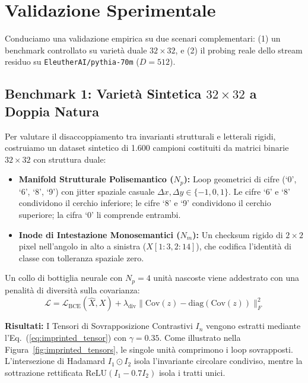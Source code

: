 \documentclass[11pt,a4paper]{article}
\theoremstyle{definition}
\begin{document}
\section{Validazione Sperimentale}

Conduciamo una validazione empirica su due scenari complementari: (1) un benchmark controllato su varietà duale $32 \times 32$, e (2) il probing reale dello stream residuo su \texttt{EleutherAI/pythia-70m} ($D=512$).

\subsection{Benchmark 1: Varietà Sintetica \texorpdfstring{$32 \times 32$}{32x32} a Doppia Natura}
Per valutare il disaccoppiamento tra invarianti strutturali e letterali rigidi, costruiamo un dataset sintetico di 1.600 campioni costituiti da matrici binarie $32 \times 32$ con struttura duale:
\begin{itemize}[leftmargin=*, itemsep=2.0pt]
    \item \textbf{Manifold Strutturale Polisemantico ($N_p$):} Loop geometrici di cifre (`0', `6', `8', `9') con jitter spaziale casuale $\Delta x, \Delta y \in \{-1, 0, 1\}$. Le cifre `6' e `8' condividono il cerchio inferiore; le cifre `8' e `9' condividono il cerchio superiore; la cifra `0' li comprende entrambi.
    \item \textbf{Inode di Intestazione Monosemantici ($N_m$):} Un checksum rigido di $2 \times 2$ pixel nell'angolo in alto a sinistra ($X[1:3, 2:14]$), che codifica l'identità di classe con tolleranza spaziale zero.
\end{itemize}

Un collo di bottiglia neurale con $N_p=4$ unità nascoste viene addestrato con una penalità di diversità sulla covarianza:
\begin{equation}
    \mathcal{L} = \mathcal{L}_{\mathrm{BCE}}(\hat{X}, X) + \lambda_{\mathrm{div}} \|\mathrm{Cov}(z) - \mathrm{diag}(\mathrm{Cov}(z))\|_F^2
\end{equation}

\textbf{Risultati:} I Tensori di Sovrapposizione Contrastivi $I_n$ vengono estratti mediante l'Eq.~(\ref{eq:imprinted_tensor}) con $\gamma = 0.35$. Come illustrato nella Figura~\ref{fig:imprinted_tensors}, le singole unità comprimono i loop sovrapposti. L'intersezione di Hadamard $I_1 \odot I_2$ isola l'invariante circolare condiviso, mentre la sottrazione rettificata $\mathrm{ReLU}(I_1 - 0.7 I_2)$ isola i tratti unici.
\end{document}

